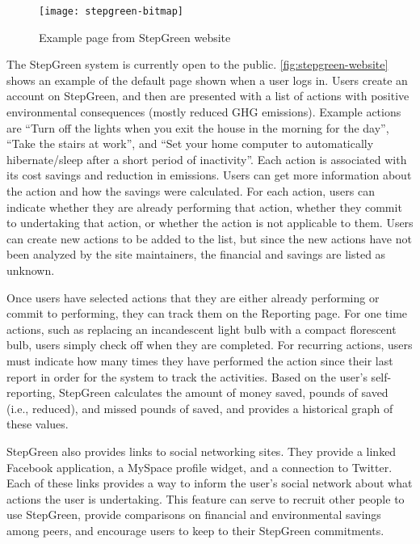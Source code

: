 \begin{figure}[htbp]
	\centering
		\texttt{[image: stepgreen-bitmap]}
		\caption{Example page from StepGreen website}
		\label{fig:stepgreen-website}
\end{figure}

The StepGreen system is currently open to the public. \autoref{fig:stepgreen-website} shows an example of the default page shown when a user logs in. Users create an account on StepGreen, and then are presented with a list of actions with positive environmental consequences (mostly reduced GHG emissions). Example actions are ``Turn off the lights when you exit the house in the morning for the day'', ``Take the stairs at work'', and ``Set your home computer to automatically hibernate/sleep after a short period of inactivity''. Each action is associated with its cost savings and reduction in \COtwo emissions. Users can get more information about the action and how the savings were calculated. For each action, users can indicate whether they are already performing that action, whether they commit to undertaking that action, or whether the action is not applicable to them. Users can create new actions to be added to the list, but since the new actions have not been analyzed by the site maintainers, the financial and \COtwo savings are listed as unknown.

Once users have selected actions that they are either already performing or commit to performing, they can track them on the Reporting page. For one time actions, such as replacing an incandescent light bulb with a compact florescent bulb, users simply check off when they are completed. For recurring actions, users must indicate how many times they have performed the action since their last report in order for the system to track the activities. Based on the user's self-reporting, StepGreen calculates the amount of money saved, pounds of \COtwo saved (i.e., reduced), and missed pounds of \COtwo saved, and provides a historical graph of these values.

StepGreen also provides links to social networking sites. They provide a linked Facebook application, a MySpace profile widget, and a connection to Twitter. Each of these links provides a way to inform the user's social network about what actions the user is undertaking. This feature can serve to recruit other people to use StepGreen, provide comparisons on financial and environmental savings among peers, and encourage users to keep to their StepGreen commitments. 

